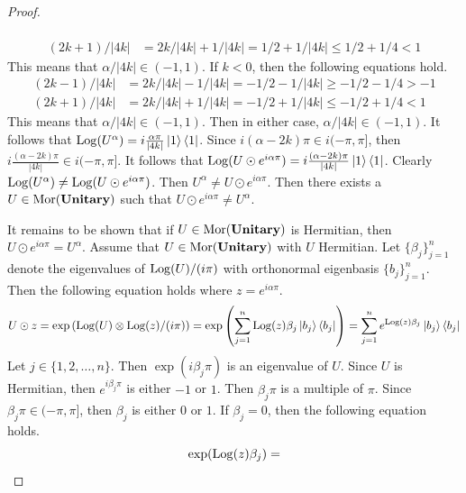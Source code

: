\begin{proof}
\begin{itemize}
\begin{align*}
              \\
              (2k + 1)/|4k| &= 2k/|4k| + 1/|4k| = 1/2 + 1/|4k| \le 1/2 + 1/4 < 1
          \end{align*}
          This means that $\alpha / |4k| \in ( -1, 1 )$.
          If $k < 0$, then the following equations hold.
          \begin{align*}
              (2k - 1)/|4k| &= 2k/|4k| - 1/|4k| = -1/2 - 1/|4k| \ge -1/2 - 1/4 > -1
              \\
              (2k + 1)/|4k| &= 2k/|4k| + 1/|4k| = -1/2 + 1/|4k| \le -1/2 + 1/4 < 1
          \end{align*}
          This means that $\alpha / |4k| \in ( -1, 1 )$.
          Then in either case, $\alpha / |4k| \in ( -1, 1 )$.
          It follows that $\operatorname{Log}( U^\alpha ) = i \frac{\alpha\pi}{|4k|} \ket{1} \bra{1}$.
          Since $i( \alpha - 2k )\pi \in i( -\pi, \pi ]$, then $i \frac{(\alpha - 2k)\pi}{|4k|} \in i( -\pi, \pi ]$.
          It follows that $\operatorname{Log}( U \odot e^{i\alpha\pi} ) = i \frac{(\alpha - 2k)\pi}{|4k|} \ket{1} \bra{1}$.
          Clearly $\operatorname{Log}( U^\alpha ) \ne \operatorname{Log}( U \odot e^{i\alpha\pi} )$.
          Then $U^\alpha \ne U \odot e^{i\alpha\pi}$.
          Then there exists a $U \in \operatorname{Mor}( \mathbf{Unitary} )$ such that $U \odot e^{i\alpha\pi} \ne U^\alpha$.
    \end{itemize}
    It remains to be shown that if $U \in \operatorname{Mor}( \mathbf{Unitary} )$ is Hermitian, then $U \odot e^{i\alpha\pi} = U^\alpha$.
    Assume that $U \in \operatorname{Mor}( \mathbf{Unitary} )$ with $U$ Hermitian.
    Let $\{ \beta_j \}_{j=1}^n$ denote the eigenvalues of $\operatorname{Log}( U ) / (i\pi)$ with orthonormal eigenbasis $\{ b_j \}_{j=1}^n$.
    Then the following equation holds where $z = e^{i\alpha\pi}$.
    \begin{equation*}
        U \odot z
        =
        \exp\left( \operatorname{Log}( U ) \otimes \operatorname{Log}( z ) / (i\pi) \right)
        =
        \exp\left( \sum_{j=1}^n \operatorname{Log}( z ) \beta_j \ket{b_j} \bra{b_j} \right)
        =
        \sum_{j=1}^n e^{\operatorname{Log}( z ) \beta_j} \ket{b_j} \bra{b_j}
    \end{equation*}
    Let $j \in \{ 1, 2, \ldots, n \}$.
    Then $\exp( i\beta_j\pi )$ is an eigenvalue of $U$.
    Since $U$ is Hermitian, then $e^{i\beta_j\pi}$ is either $-1$ or $1$.
    Then $\beta_j\pi$ is a multiple of $\pi$.
    Since $\beta_j\pi \in ( -\pi, \pi ]$, then $\beta_j$ is either $0$ or $1$.
    If $\beta_j = 0$, then the following equation holds.
    \begin{equation*}
        \exp( \Log(z)\beta_j )
        =

\end{equation*}
\end{proof}

